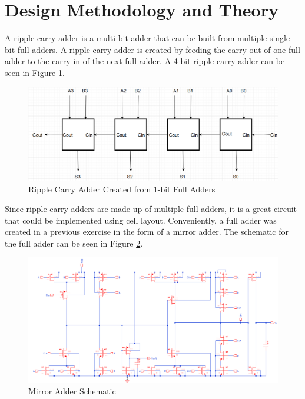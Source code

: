 \documentclass[11pt]{article}
\begin{document}
\section{Design Methodology and Theory}

	A ripple carry adder is a multi-bit adder that can be built from multiple single-bit full adders. A ripple carry adder is created by feeding the carry out of one full adder to the carry in of the next full adder. A 4-bit ripple carry adder can be seen in Figure \ref{fig:rippleadder-design}.

	\begin{figure}[H]
		\centering
		\includegraphics[width=0.7\linewidth]{"Pictures/Ripple Carry Adder"}
		\caption{Ripple Carry Adder Created from 1-bit Full Adders}
		\label{fig:rippleadder-design}
	\end{figure}
	
	Since ripple carry adders are made up of multiple full adders, it is a great circuit that could be implemented using cell layout. Conveniently, a full adder was created in a previous exercise in the form of a mirror adder. The schematic for the full adder can be seen in Figure \ref{fig:mirror-adder-schematic}.
	
	\begin{figure}[H]
		\centering
		\includegraphics[width=1\linewidth]{"Pictures/Mirror Adder Schematic"}
		\caption{Mirror Adder Schematic}
		\label{fig:mirror-adder-schematic}
	\end{figure}
\end{document}
